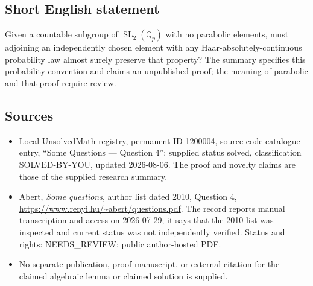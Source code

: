 \documentclass[11pt]{article}
\newcommand{\Q}{\mathbb{Q}}
\begin{document}
\subsection{Short English statement}
Given a countable subgroup of $\operatorname{SL}_2(\Q_p)$ with no parabolic elements, must adjoining an independently chosen element with any Haar-absolutely-continuous probability law almost surely preserve that property? The summary specifies this probability convention and claims an unpublished proof; the meaning of parabolic and that proof require review.
\subsection{Sources}
\begin{itemize}
\item Local UnsolvedMath registry, permanent ID 1200004, source code catalogue entry, ``Some Questions --- Question 4''; supplied status solved, classification SOLVED-BY-YOU, updated 2026-08-06. The proof and novelty claims are those of the supplied research summary.
\item Abert, \emph{Some questions}, author list dated 2010, Question 4, \url{https://www.renyi.hu/~abert/questions.pdf}. The record reports manual transcription and access on 2026-07-29; it says that the 2010 list was inspected and current status was not independently verified. Status and rights: NEEDS\_REVIEW; public author-hosted PDF.
\item No separate publication, proof manuscript, or external citation for the claimed algebraic lemma or claimed solution is supplied.
\end{itemize}
\end{document}

